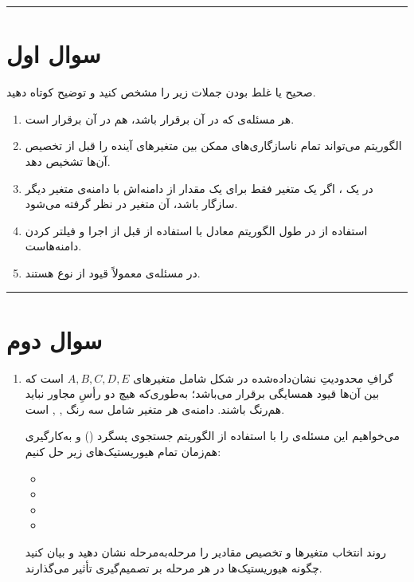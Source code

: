 \documentclass[a4paper,10pt]{article}
\begin{document}
\vspace{8pt}
\textcolor{AccentCyan}{\rule{\linewidth}{0.8pt}}
\section{\textcolor{AccentGold}{سوال اول}}

صحیح یا غلط بودن جملات زیر را مشخص کنید و توضیح کوتاه دهید.
\begin{enumerate}
	\item هر مسئله‌ی  که  در آن برقرار باشد،  هم در آن برقرار است.

	\item الگوریتم  می‌تواند تمام ناسازگاری‌های ممکن بین متغیرهای آینده را قبل از تخصیص آن‌ها تشخیص دهد.
	
	\item در یک ، اگر یک متغیر فقط برای یک مقدار از دامنه‌اش با دامنه‌ی متغیر دیگر سازگار باشد، آن متغیر  در نظر گرفته می‌شود.
	
	\item استفاده از  در طول الگوریتم معادل با استفاده از  قبل از اجرا و فیلتر کردن دامنه‌هاست.
	
	\item در مسئله‌ی  معمولاً قیود از نوع  هستند.
\end{enumerate}

\bigskip
\textcolor{AccentCyan}{\rule{\linewidth}{0.4pt}}

\clearpage
\section{\textcolor{AccentGold}{سوال دوم}}
\begin{enumerate}
	\item گرافِ محدودیتِ نشان‌داده‌شده در شکل شامل متغیرهای $A,B,C,D,E$ است که بین آن‌ها قیود همسایگی برقرار می‌باشد؛ به‌طوری‌که هیچ دو رأسِ مجاور نباید هم‌رنگ باشند. دامنه‌ی هر متغیر شامل سه رنگ , ,  است.
	
	می‌خواهیم این مسئله‌ی  را با استفاده از الگوریتم جستجوی پسگرد () و به‌کارگیری هم‌زمان تمام هیوریستیک‌های زیر حل کنیم:
	\begin{itemize}
		\item {}
		\item {}
		\item {}
		\item {}
	\end{itemize}
	
	روند انتخاب متغیرها و تخصیص مقادیر را مرحله‌به‌مرحله نشان دهید و بیان کنید چگونه هیوریستیک‌ها در هر مرحله بر تصمیم‌گیری تأثیر می‌گذارند.
\end{enumerate}
\end{document}
